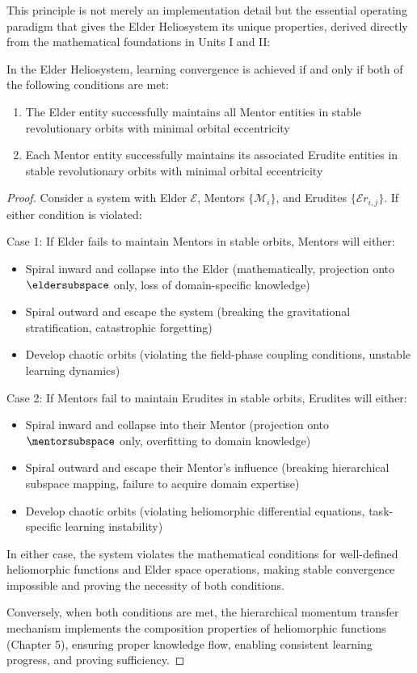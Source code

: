 This principle is not merely an implementation detail but the essential operating paradigm that gives the Elder Heliosystem its unique properties, derived directly from the mathematical foundations in Units I and II:

\begin{theorem}
\label{thm:gravitational_stability}
In the Elder Heliosystem, learning convergence is achieved if and only if both of the following conditions are met:
\begin{enumerate}
    \item The Elder entity successfully maintains all Mentor entities in stable revolutionary orbits with minimal orbital eccentricity
    \item Each Mentor entity successfully maintains its associated Erudite entities in stable revolutionary orbits with minimal orbital eccentricity
\end{enumerate}
\end{theorem}

\begin{proof}
Consider a system with Elder $\mathcal{E}$, Mentors $\{\mathcal{M}_i\}$, and Erudites $\{\mathcal{E}r_{i,j}\}$. If either condition is violated:

Case 1: If Elder fails to maintain Mentors in stable orbits, Mentors will either:
\begin{itemize}
    \item Spiral inward and collapse into the Elder (mathematically, projection onto $\eldersubspace$ only, loss of domain-specific knowledge)
    \item Spiral outward and escape the system (breaking the gravitational stratification, catastrophic forgetting)
    \item Develop chaotic orbits (violating the field-phase coupling conditions, unstable learning dynamics)
\end{itemize}

Case 2: If Mentors fail to maintain Erudites in stable orbits, Erudites will either:
\begin{itemize}
    \item Spiral inward and collapse into their Mentor (projection onto $\mentorsubspace$ only, overfitting to domain knowledge)
    \item Spiral outward and escape their Mentor's influence (breaking hierarchical subspace mapping, failure to acquire domain expertise)
    \item Develop chaotic orbits (violating heliomorphic differential equations, task-specific learning instability)
\end{itemize}

In either case, the system violates the mathematical conditions for well-defined heliomorphic functions and Elder space operations, making stable convergence impossible and proving the necessity of both conditions.

Conversely, when both conditions are met, the hierarchical momentum transfer mechanism implements the composition properties of heliomorphic functions (Chapter 5), ensuring proper knowledge flow, enabling consistent learning progress, and proving sufficiency.
\end{proof}


